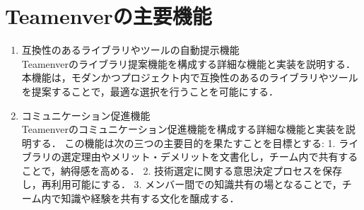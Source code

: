 \documentclass[main]{subfiles}
\begin{document}
\section{Teamenverの主要機能}
\begin{enumerate}
\item 互換性のあるライブラリやツールの自動提示機能\\
Teamenverのライブラリ提案機能を構成する詳細な機能と実装を説明する．
本機能は，モダンかつプロジェクト内で互換性のあるのライブラリやツールを提案することで，最適な選択を行うことを可能にする．
\item コミュニケーション促進機能\\
Teamenverのコミュニケーション促進機能を構成する詳細な機能と実装を説明する．
この機能は次の三つの主要目的を果たすことを目標とする: 1.	ライブラリの選定理由やメリット・デメリットを文書化し，チーム内で共有することで，納得感を高める．
2.	技術選定に関する意思決定プロセスを保存し，再利用可能にする．
3.	メンバー間での知識共有の場となることで，チーム内で知識や経験を共有する文化を醸成する．
\end{enumerate}
\end{document}
